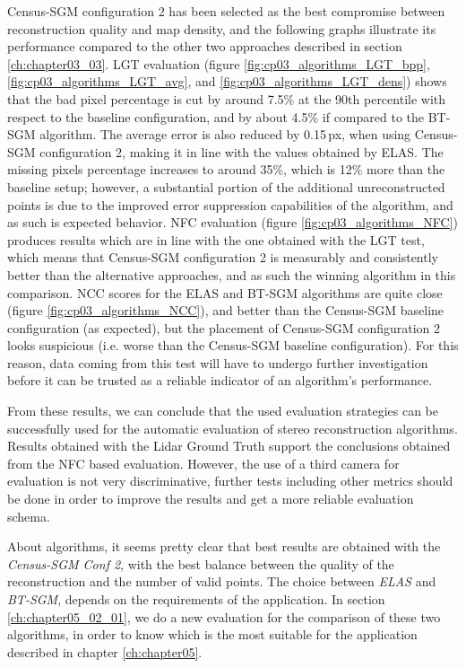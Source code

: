 Census-SGM configuration 2 has been selected as the best compromise between reconstruction quality and map density, and the following graphs illustrate its performance compared to the other two approaches described in section \ref{ch:chapter03_03}. LGT evaluation (figure \ref{fig:cp03_algorithms_LGT_bpp}, \ref{fig:cp03_algorithms_LGT_avg}, and \ref{fig:cp03_algorithms_LGT_dens}) shows that the bad pixel percentage is cut by around 7.5\% at the 90th percentile with respect to the baseline configuration, and by about 4.5\% if compared to the BT-SGM algorithm. The average error is also reduced by 0.15\,px, when using Census-SGM configuration 2, making it in line with the values obtained by ELAS. The missing pixels percentage increases to around 35\%, which is 12\% more than the baseline setup; however, a substantial portion of the additional unreconstructed points is due to the improved error suppression capabilities of the algorithm, and as such is expected behavior.
NFC evaluation (figure \ref{fig:cp03_algorithms_NFC}) produces results which are in line with the one obtained with the LGT test, which means that Census-SGM configuration 2 is measurably and consistently better than the alternative approaches, and as such the winning algorithm in this comparison.
NCC scores for the ELAS and BT-SGM algorithms are quite close (figure \ref{fig:cp03_algorithms_NCC}), and better than the Census-SGM baseline configuration (as expected), but the placement of Census-SGM configuration 2 looks suspicious (i.e. worse than the Census-SGM baseline configuration). For this reason, data coming from this test will have to undergo further investigation before it can be trusted as a reliable indicator of an algorithm's performance.

From these results, we can conclude that the used evaluation strategies can be successfully used for the automatic evaluation of stereo reconstruction algorithms. Results obtained with the Lidar Ground Truth support the conclusions obtained from the NFC based evaluation. However, the use of a third camera for evaluation is not very discriminative, further tests including other metrics should be done in order to improve the results and get a more reliable evaluation schema.

About algorithms, it seems pretty clear that best results are obtained with the \emph{Census-SGM Conf 2}, with the best balance between the quality of the reconstruction and the number of valid points. The choice between \emph{ELAS} and \emph{BT-SGM}, depends on the requirements of the application. In section \ref{ch:chapter05_02_01}, we do a new evaluation for the comparison of these two algorithms, in order to know which is the most suitable for the application described in chapter \ref{ch:chapter05}.

